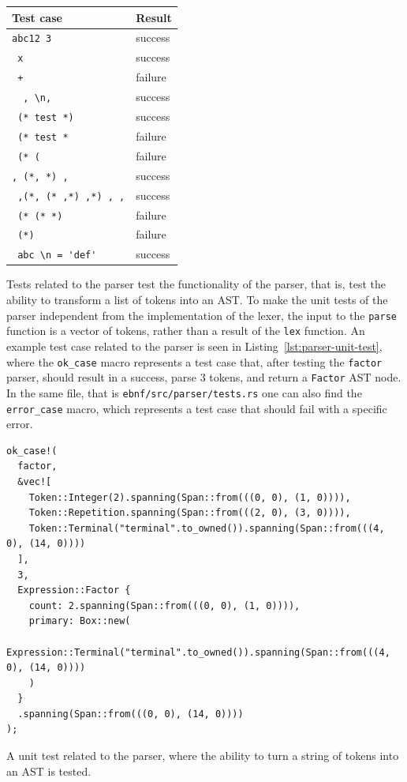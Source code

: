 \documentclass[english,bachelors,forcepolishlogotype]{wizthesis}
\begin{document}
\begin{table}[H]
\begin{tabular}{@{}ll@{}}
  \end{tabular}
  \hspace{0.5cm}
  \begin{tabular}{@{}ll@{}}
    \toprule
    Test case & Result \\ \midrule
    \verb*@abc12 3 @             & success \\
    \verb*@ x @                  & success \\
    \verb*@ + @                  & failure \\
    \verb*@  , \n,@              & success \\
    \verb*@ (* test *) @         & success \\
    \verb*@ (* test * @          & failure \\
    \verb*@ (* (@                & failure \\
    \verb*@, (*, *) , @          & success \\
    \verb*@ ,(*, (* ,*) ,*) , ,@ & success \\
    \verb*@ (* (* *) @           & failure \\
    \verb*@ (*) @                & failure \\
    \verb*@ abc \n = 'def' @     & success \\ \bottomrule
  \end{tabular}
\end{table}

Tests related to the parser test the functionality of the parser, that is, test
the ability to transform a list of tokens into an AST. To make the unit tests of
the parser independent from the implementation of the lexer, the input to the
\texttt{parse} function is a vector of tokens, rather than a result of the
\texttt{lex} function. An example test case related to the parser is seen in
Listing~\ref{lst:parser-unit-test}, where the \texttt{ok\_case} macro represents
a test case that, after testing the \texttt{factor} parser, should result in a
success, parse 3 tokens, and return a \texttt{Factor} AST node. In the same
file, that is \texttt{ebnf/src/parser/tests.rs} one can also find the
\texttt{error\_case} macro, which represents a test case that should fail with a
specific error.

\begin{listing}[H]
  \begin{verbatim}
ok_case!(
  factor,
  &vec![
    Token::Integer(2).spanning(Span::from(((0, 0), (1, 0)))),
    Token::Repetition.spanning(Span::from(((2, 0), (3, 0)))),
    Token::Terminal("terminal".to_owned()).spanning(Span::from(((4, 0), (14, 0))))
  ],
  3,
  Expression::Factor {
    count: 2.spanning(Span::from(((0, 0), (1, 0)))),
    primary: Box::new(
      Expression::Terminal("terminal".to_owned()).spanning(Span::from(((4, 0), (14, 0))))
    )
  }
  .spanning(Span::from(((0, 0), (14, 0))))
);
  \end{verbatim}
  \caption{A unit test related to the parser, where the ability to turn a string
  of tokens into an AST is tested.}
  \label{lst:parser-unit-test}
\end{listing}
\end{document}
